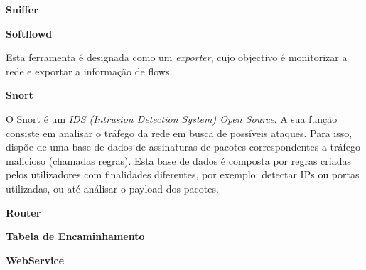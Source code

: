 \begin{description}
    \item \textbf{Sniffer}
\end{description}

\begin{description}
    \item \textbf{Softflowd}

Esta ferramenta é designada como um \textit{exporter}, cujo objectivo é monitorizar a rede e exportar a informação de flows.
\end{description}

\begin{description}
    \item \textbf{Snort}

O Snort é um \textit{IDS (Intrusion Detection System) Open Source}. A sua função consiste em analisar o tráfego da rede em busca de possíveis ataques. Para isso, dispõe de uma base de dados de assinaturas de pacotes correspondentes a tráfego malicioso (chamadas regras). Esta base de dados é composta por regras criadas pelos utilizadores com finalidades diferentes, por exemplo: detectar IPs ou portas utilizadas, ou até análisar o payload dos pacotes.
\end{description}

\begin{description}
    \item \textbf{Router}
\end{description}

\begin{description}
    \item \textbf{Tabela de Encaminhamento}
\end{description}

\begin{description}
    \item \textbf{WebService}
\end{description}
